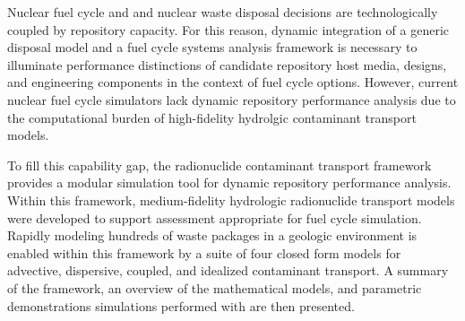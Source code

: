 

Nuclear fuel cycle and and nuclear waste disposal decisions are
technologically coupled by repository capacity.  For this reason, dynamic
integration of a generic disposal model and a fuel cycle systems analysis
framework is necessary to illuminate performance distinctions of candidate
repository host media, designs, and engineering components in the context of
fuel cycle options. However, current nuclear fuel cycle simulators lack dynamic
repository performance analysis due to the computational burden of
high-fidelity hydrolgic contaminant transport models.

To fill this capability gap, the \Cyder radionuclide contaminant transport
framework provides a modular simulation tool for dynamic repository performance
analysis.  Within this framework, medium-fidelity hydrologic radionuclide
transport models were developed to support assessment appropriate for fuel
cycle simulation. Rapidly modeling hundreds of waste packages in a geologic
environment is enabled within this framework by a suite of four closed form
models for advective, dispersive, coupled, and idealized contaminant transport.
A summary of the framework, an overview of the mathematical models, and
parametric demonstrations simulations performed with \Cyder are then
presented.
